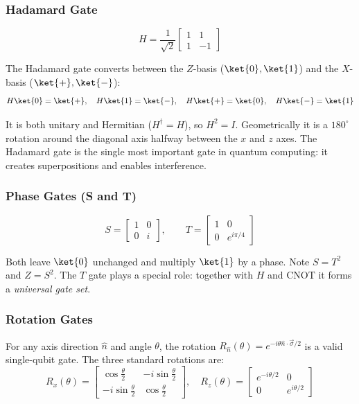 \documentclass[oneside]{academica}
\begin{document}
\subsubsection{Hadamard Gate}

\begin{equation*}
  H=\frac{1}{\sqrt{2}}\begin{bmatrix}1&1\\1&-1\end{bmatrix}
\end{equation*}

The Hadamard gate converts between the $Z$-basis ($\ket{0},\ket{1}$) and the $X$-basis ($\ket{+},\ket{-}$):
\begin{equation*}
  H\ket{0}=\ket{+},\quad H\ket{1}=\ket{-},\quad H\ket{+}=\ket{0},\quad H\ket{-}=\ket{1}
\end{equation*}

It is both unitary and Hermitian ($H^\dagger=H$), so $H^2=I$.
Geometrically it is a $180^\circ$ rotation around the diagonal axis halfway between the $x$ and $z$ axes.
The Hadamard gate is the single most important gate in quantum computing: it creates superpositions and enables interference.

\subsubsection{Phase Gates (S and T)}

\begin{equation*}
  S=\begin{bmatrix}1&0\\0&i\end{bmatrix},\qquad
  T=\begin{bmatrix}1&0\\0&e^{i\pi/4}\end{bmatrix}
\end{equation*}

Both leave $\ket{0}$ unchanged and multiply $\ket{1}$ by a phase.
Note $S=T^2$ and $Z=S^2$.
The $T$ gate plays a special role: together with $H$ and CNOT it forms a \emph{universal gate set}.

\subsubsection{Rotation Gates}

For any axis direction $\hat n$ and angle $\theta$, the rotation $R_{\hat n}(\theta)=e^{-i\theta\hat n\cdot\vec\sigma/2}$ is a valid single-qubit gate.
The three standard rotations are:
\begin{equation*}
  R_x(\theta)=\begin{bmatrix}\cos\frac\theta2&-i\sin\frac\theta2\\-i\sin\frac\theta2&\cos\frac\theta2\end{bmatrix},\quad
  R_z(\theta)=\begin{bmatrix}e^{-i\theta/2}&0\\0&e^{i\theta/2}\end{bmatrix}
\end{equation*}
\end{document}
